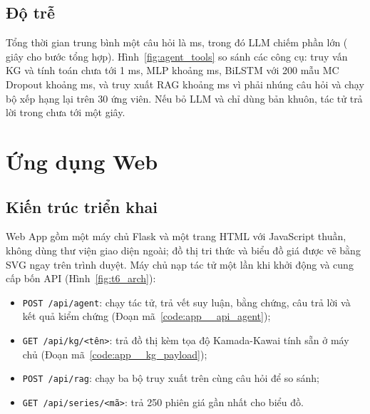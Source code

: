 \subsection{Độ trễ}
Tổng thời gian trung bình một câu hỏi là  ms, trong đó LLM chiếm phần lớn
( giây cho bước tổng hợp). Hình~\ref{fig:agent_tools} so sánh các công cụ: truy vấn KG và
tính toán chưa tới 1 ms, MLP khoảng  ms, BiLSTM với 200 mẫu MC Dropout khoảng
 ms, và truy xuất RAG khoảng  ms vì phải
nhúng câu hỏi và chạy bộ xếp hạng lại trên 30 ứng viên. Nếu bỏ LLM và chỉ dùng bản khuôn, tác tử trả lời trong
chưa tới một giây.


\section{Ứng dụng Web}\label{sec:webapp}
\subsection{Kiến trúc triển khai}
Web App gồm một máy chủ Flask và một trang HTML với JavaScript thuần, không dùng thư viện giao diện ngoài; đồ thị tri
thức và biểu đồ giá được vẽ bằng SVG ngay trên trình duyệt. Máy chủ nạp tác tử một lần khi khởi động và cung cấp bốn
API (Hình~\ref{fig:t6_arch}):

\begin{itemize}
  \item \texttt{POST /api/agent}: chạy tác tử, trả vết suy luận, bằng chứng, câu trả lời và kết quả kiểm chứng
        (Đoạn mã~\ref{code:app__api_agent});
  \item \texttt{GET /api/kg/<tên>}: trả đồ thị kèm tọa độ Kamada-Kawai tính sẵn ở máy chủ
        (Đoạn mã~\ref{code:app__kg_payload});
  \item \texttt{POST /api/rag}: chạy ba bộ truy xuất trên cùng câu hỏi để so sánh;
  \item \texttt{GET /api/series/<mã>}: trả 250 phiên giá gần nhất cho biểu đồ.
\end{itemize}


